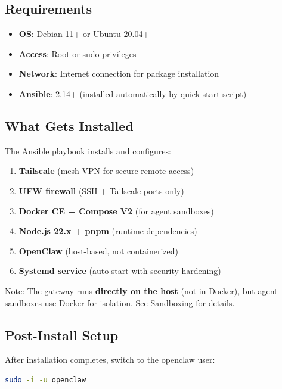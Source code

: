 \subsection{Requirements}


\begin{itemize}
  \item \textbf{OS}: Debian 11+ or Ubuntu 20.04+
  \item \textbf{Access}: Root or sudo privileges
  \item \textbf{Network}: Internet connection for package installation
  \item \textbf{Ansible}: 2.14+ (installed automatically by quick-start script)
\end{itemize}


\subsection{What Gets Installed}


The Ansible playbook installs and configures:

\begin{enumerate}
  \item \textbf{Tailscale} (mesh VPN for secure remote access)
  \item \textbf{UFW firewall} (SSH + Tailscale ports only)
  \item \textbf{Docker CE + Compose V2} (for agent sandboxes)
  \item \textbf{Node.js 22.x + pnpm} (runtime dependencies)
  \item \textbf{OpenClaw} (host-based, not containerized)
  \item \textbf{Systemd service} (auto-start with security hardening)
\end{enumerate}


Note: The gateway runs \textbf{directly on the host} (not in Docker), but agent sandboxes use Docker for isolation. See \href{/gateway/sandboxing}{Sandboxing} for details.

\subsection{Post-Install Setup}


After installation completes, switch to the openclaw user:

\begin{lstlisting}[language=bash]
sudo -i -u openclaw
\end{lstlisting}


